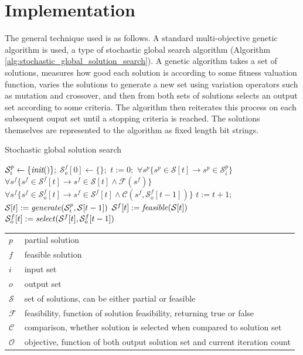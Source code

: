 \section{Implementation}
The general technique used is as follows.  A standard  multi-objective genetic algorithm is used, a type of stochastic global search algorithm (Algorithm \ref{alg:stochastic_global_solution_search}).  A genetic algorithm takes a set of solutions, measures how good each solution is according to some fitness valuation function, varies the solutions to generate a new set using variation operators such as mutation and crossover, and then from both sets of solutions selects an output set according to some criteria.  The algorithm then reiterates this process on each subsequent ouput set until a stopping criteria is reached.  The solutions themselves are represented to the algorithm as fixed length bit strings.  

\begin{algorithm}
  \caption{Stochastic global solution search}
  \label{alg:stochastic_global_solution_search}
  \begin{algorithmic}
    \STATE $\mathcal{S}^p_i \leftarrow \{\emph{init}()\};$
    \STATE $\mathcal{S}^f_o[0] \leftarrow \{\};$
    \STATE $t := 0;$
    \ENSURE $\forall s^p \{s^p \in \mathcal{S}[t] \rightarrow s^p \in \mathcal{S}^p_i\}$
    \ENSURE $\forall s^f \{s^f \in \mathcal{S}^f[t] \rightarrow s^f \in \mathcal{S}[t] \wedge \mathcal{F}(s^f)\}$
    \ENSURE $\forall s^f \{s^f \in \mathcal{S}^f_o[t] \rightarrow s^f \in \mathcal{S}^f[t] \wedge \mathcal{C}(s^f, \mathcal{S}^f_o[t - 1])\}$
    \STATE $t := t + 1;$
    \STATE $\mathcal{S}[t] := \mbox{\emph{generate}}(\mathcal{S}^p_i,\mathcal{S}[t-1])$
    \STATE $\mathcal{S}^f[t] := \mbox{\emph{feasible}}(\mathcal{S}[t])$
    \STATE $\mathcal{S}^f_o[t] := \mbox{\emph{select}}(\mathcal{S}^f[t], \mathcal{S}^f_o[t-1])$
    \ENDWHILE
  \end{algorithmic}
  \begin{tabular}{|l|l|}
  \hline
    $p$ & partial solution \\
    $f$ & feasible solution \\
    $i$ & input set \\
    $o$ & output set \\
    $\mathcal{S}$ & set of solutions, can be either partial or feasible \\
    $\mathcal{F}$ & feasibility, function of solution feasibility, returning true or false \\
    $\mathcal{C}$ & comparison, whether solution is selected when compared to solution set \\
    $\mathcal{O}$ & objective, function of both output solution set and current iteration count \\
  \hline
  \end{tabular}
\end{algorithm}

